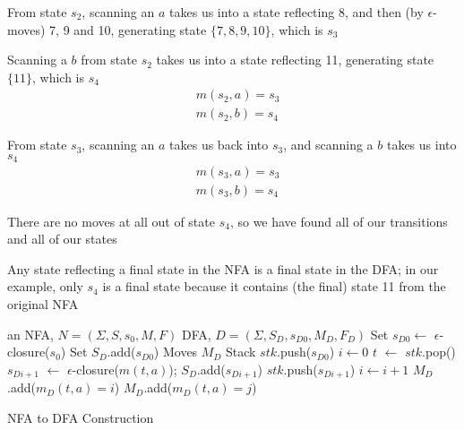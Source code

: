\documentclass[8pt,a4paper,compress]{beamer}
\begin{document}
\begin{frame}[fragile]
\pause

From state $s_2$, scanning an $a$ takes us into a state reflecting 8, and then (by $\epsilon$-moves) 7, 9 and 10, generating state $\{7, 8, 9, 10\}$, which is $s_3$

\pause
\bigskip

Scanning a $b$ from state $s_2$ takes us into a state reflecting 11, generating state $\{11\}$, which is $s_4$
\begin{align}
& m(s_2, a) = s_3 \nonumber \\
& m(s_2, b) = s_4 \nonumber
\end{align}

\pause
\bigskip

From state $s_3$, scanning an $a$ takes us back into $s_3$, and scanning a $b$ takes us into $s_4$
\begin{align}
& m(s_3, a) = s_3 \nonumber \\
& m(s_3, b) = s_4 \nonumber
\end{align}

\pause
\bigskip

There are no moves at all out of state $s_4$, so we have found all of our transitions and all of our states

\pause
\bigskip

Any state reflecting a final state in the NFA is a final state in the DFA; in our example, only $s_4$ is a final state because it contains (the final) state 11 from the original NFA
\end{frame}

\begin{frame}[fragile]
\pause

The DFA derived from our NFA for the regular expression $(a|b)a*b$ is shown below
\begin{center}
}
\end{center}
\end{frame}

\begin{frame}[fragile]
\pause

\begin{algorithm}[H]
\begin{algorithmic}
\REQUIRE an NFA, $N = (\Sigma, S, s_0, M, F)$
\ENSURE DFA, $D = (\Sigma, S_D, s_{D0}, M_D, F_D)$
\STATE Set $s_{D0} \gets$  $\epsilon$-closure($s_0$)
\STATE Set $S_D$.add($s_{D0}$)
\STATE Moves $M_D$
\STATE Stack $stk$.push($s_{D0}$)
\STATE $i \gets 0$
\STATE $t$ $\gets$ $stk$.pop()
\STATE $s_{Di+1}$ $\gets$ $\epsilon$-closure($m(t, a)$);
\STATE $S_D$.add($s_{Di+1}$) 
\STATE $stk$.push($s_{Di+1}$)
\STATE $i \gets i + 1$
\STATE $M_D$.add($m_D(t,a) = i$)
\STATE $M_D$.add($m_D(t, a) = j$) 
\ENDIF
\ENDIF
\ENDFOR
\ENDWHILE
\end{algorithmic}
\caption{NFA to DFA Construction}
\end{algorithm}
\end{frame}
\end{document}
